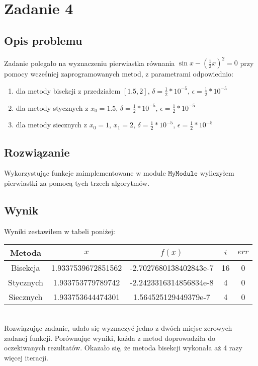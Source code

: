 \section{Zadanie 4}
\subsection{Opis problemu}
Zadanie polegało na wyznaczeniu pierwiastka równania $ \sin{x} - (\frac{1}{2}x)^{2} = 0 $ przy pomocy wcześniej zaprogramowanych metod, z parametrami odpowiednio:
\begin{enumerate}
  \item dla metody bisekcji z przedziałem $[1.5, 2]$, $\delta = \frac{1}{2}*10^{-5}$, $\epsilon = \frac{1}{2}*10^{-5}$
  \item dla metody stycznych z $ x_0 = 1.5$, $\delta = \frac{1}{2}*10^{-5}$, $\epsilon = \frac{1}{2}*10^{-5}$  
  \item dla metody siecznych z $ x_0 = 1$, $x_1 = 2$, $\delta = \frac{1}{2}*10^{-5}$, $\epsilon = \frac{1}{2}*10^{-5}$
  
  \end{enumerate}
\subsection{Rozwiązanie}
Wykorzystując funkcje zaimplementowane w module $ \texttt{MyModule} $ wyliczyłem pierwiastki za pomocą  tych trzech algorytmów.
\subsection{Wynik}


Wyniki zestawiłem w tabeli poniżej: \\
\begin{center}
\begin{tabular}{|c|c|c|c|c|}
  \hline 
    Metoda & $x$ & $ f(x)$ & $i$ & $err$ \\
  \hline
  Bisekcja & 1.9337539672851562 & -2.7027680138402843e-7 & 16 & 0\\
  \hline 
  Stycznych & 1.933753779789742 & -2.2423316314856834e-8 & 4 & 0\\
  \hline  
  Siecznych & 1.933753644474301 & 1.564525129449379e-7 & 4 & 0 \\
  \hline
\end{tabular} 
\end{center}

\ \\
Rozwiązując zadanie, udało się wyznaczyć jedno z dwóch miejsc zerowych zadanej funkcji. Porównując wyniki, każda z metod doprowadziła do oczekiwanych rezultatów. Okazało się, że metoda bisekcji wykonała aż 4 razy więcej iteracji. 
